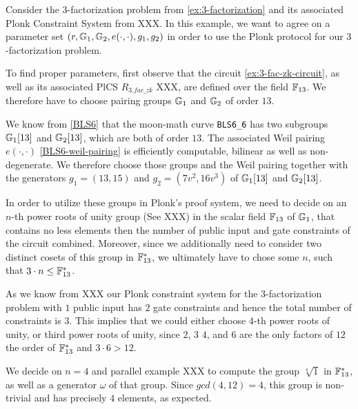 \begin{example}
\label{ex:3-fac-plonk-params} Consider the $3$-factorization problem from \ref{ex:3-factorization} and its associated Plonk Constraint System from XXX. In this example, we want to agree on a parameter set $(r, \mathbb{G}_1, \mathbb{G}_2, e(\cdot,\cdot), g_1, g_2)$ in order to use the Plonk protocol for our $3$-factorization problem. 

To find proper parameters, first observe that the circuit \ref{ex:3-fac-zk-circuit}, as well as its associated PlCS $R_{3.fac\_zk}$ XXX, are defined over the field $\mathbb{F}_{13}$. We therefore have to choose pairing groups $\mathbb{G}_1$ and $\mathbb{G}_2$ of order $13$. 

We know from \ref{BLS6} that the moon-math curve \texttt{BLS6\_6} has two subgroups $\mathbb{G}_1[13]$ and $\mathbb{G}_2[13]$, which are both of order $13$. The associated Weil pairing $e(\cdot,\cdot)$ \ref{BLS6-weil-pairing} is efficiently computable, bilinear as well as non-degenerate. We therefore choose those groups and the Weil pairing together with the generators $g_1 = (13,15) $ and $g_2=(7v^2,16v^3)$ of $\mathbb{G}_1[13]$ and $\mathbb{G}_2[13]$. 

In order to utilize these groups in Plonk's proof system, we need to decide on an $n$-th power roots of unity group (See XXX) in the scalar field $\mathbb{F}_{13}$ of $\mathbb{G}_1$, that contains no less elements then the number of public input and gate constraints of the circuit combined. Moreover, since we additionally need to consider two distinct cosets of this group in $\mathbb{F}_{13}^*$, we ultimately have to chose some $n$, such that $3\cdot n \leq \mathbb{F}_{13}^*$. 

As we know from XXX our Plonk constraint system for the 3-factorization problem with $1$ public input has $2$ gate constraints and hence the total number of constraints is $3$. This implies that we could either choose $4$-th power roots of unity, or third power roots of unity, since $2$, $3$ $4$, and $6$ are the only factors of $12$ the order of $\mathbb{F}_{13}^*$ and $3\cdot 6 > 12$. 

We decide on $n=4$ and parallel example XXX to compute the group $\sqrt[4]{1}$ in $\mathbb{F}_{13}^*$, as well as a generator $\omega$ of that group. Since $gcd(4,12)=4$, this group is non-trivial and has precisely $4$ elements, as expected. 


\end{example}
